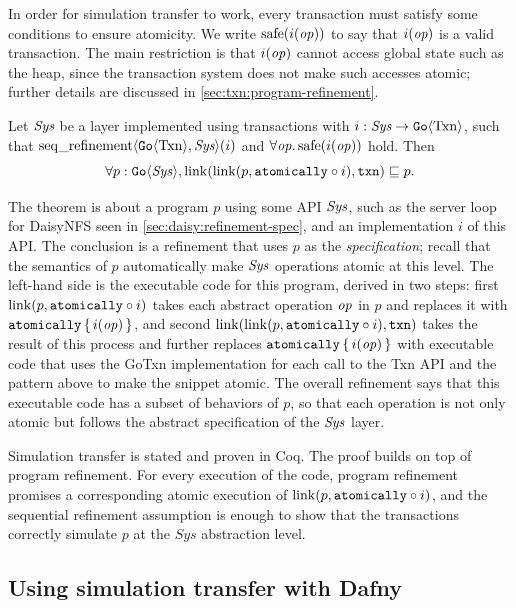 In order for simulation transfer to work, every transaction must satisfy some
conditions to ensure atomicity. We write $\mathrm{safe}(i(\mathit{op}))$ to say that $i(\mathit{op})$ is a
valid transaction. The main restriction is that $i(\mathit{op})$ cannot access global state
such as the heap, since the transaction system does not make such accesses
atomic; further details are discussed in \cref{sec:txn:program-refinement}.

\begin{theorem}
  Let $\textit{Sys}$ be a layer implemented using transactions with
$i : \textit{Sys} \to \mathtt{Go}\langle \mathrm{Txn} \rangle$, such that
$\operatorname{seq\_refinement}\langle \mathtt{Go}\langle \mathrm{Txn} \rangle, \textit{Sys} \rangle(i)$ and
$\forall \mathit{op}.\, \mathrm{safe}(i(\mathit{op}))$ hold. Then
\[
  \forall p : \mathtt{Go}\langle \mathit{Sys} \rangle, \mathrm{link}(\mathrm{link}(p, \mathtt{atomically}\circ i), \texttt{txn}) \sqsubseteq p.
\]
\label{thm:gotxn-transfer}
\end{theorem}

The theorem is about a program $p$ using some API $\mathit{Sys}$, such as the server
loop for DaisyNFS seen in \cref{sec:daisy:refinement-spec}, and an
implementation $i$ of this API.\@
The conclusion is a refinement that uses $p$ as the \emph{specification}; recall
that the semantics of $p$ automatically make $\mathit{Sys}$ operations atomic at this
level. The left-hand side is the executable code for this program, derived in
two steps: first $\mathrm{link}(p, \mathtt{atomically}\circ i)$ takes each abstract operation
$\mathit{op}$ in $p$ and replaces it with $\mathtt{atomically}\,\{\, i(\mathit{op}) \,\}$, and second
$\mathrm{link}(\mathrm{link}(p, \mathtt{atomically}\circ i), \texttt{txn})$ takes the result of this process and
further replaces $\mathtt{atomically}\,\{\, i(\mathit{op}) \,\}$ with executable code that uses the GoTxn
implementation for each call to the Txn API and the  pattern above to
make the snippet atomic. The overall refinement says that this executable code
has a subset of behaviors of $p$, so that each operation is not only atomic but
follows the abstract specification of the $\mathit{Sys}$ layer.

Simulation transfer is stated and proven in Coq. The proof builds on top of
program refinement. For every execution of the code, program refinement promises
a corresponding atomic execution of $\mathrm{link}(p, \mathtt{atomically}\circ i)$, and the
sequential refinement assumption is enough to show that the transactions
correctly simulate $p$ at the $\mathit{Sys}$ abstraction level.

\subsection{Using simulation transfer with Dafny}%
\label{sec:daisy:proof-dafny}


